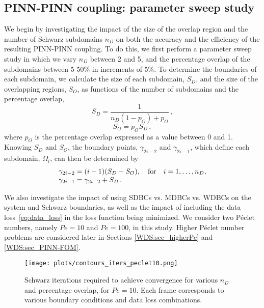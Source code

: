 \documentclass[oneside,final]{csri23}
\begin{document}
\subsection{PINN-PINN coupling: parameter sweep study} \label{WDS:sec_overlap}

We begin by investigating the impact of the size of the overlap region and the number of Schwarz subdomains $n_D$ on both the accuracy and the efficiency of the resulting PINN-PINN coupling.  To do this, we first perform a parameter sweep study in which we vary $n_D$ between 2 and 5, and the percentage overlap of the subdomains between 5-50\% in increments of 5\%. To determine the boundaries of each subdomain, we calculate the size of each subdomain, $S_D$, and the size of the overlapping regions, $S_O$, as functions of the number of subdomains and the percentage overlap,
\begin{equation} 
    S_D = \frac{1}{n_D(1 - p_{O}) + p_{O}}\, ,
\end{equation}
\begin{equation}
    S_O = p_{O}S_D\, ,
\end{equation}
where $p_O$ is the percentage overlap expressed as a value between 0 and 1. Knowing $S_D$ and $S_O$, the boundary points, $\gamma_{2i-2}$ and $\gamma_{2i-1}$, which define each subdomain, $\Omega_i$, can then be determined by
\begin{equation} \label{eq:gamma_i_formulat}
    \begin{array}[h]{l}
        \gamma_{2i-2} = (i-1)(S_D - S_O), \quad \text{for} \quad i=1,\dots,n_D,\\
        \gamma_{2i-1} = \gamma_{2i-2} + S_D\, .
    \end{array}
\end{equation}

We also investigate the impact of using SDBCs vs. MDBCs vs. WDBCs on the system and Schwarz boundaries, as well as the impact of including the data loss~\eqref{eq:data_loss} in the loss function being minimized. We consider two P\'{e}clet numbers, namely $Pe = 10$ and $Pe = 100$, in this study.
Higher P\'{e}clet number problems are considered later in Sections \ref{WDS:sec_higherPe} and \ref{WDS:sec_PINN-FOM}.  

\begin{figure}
    \centering
    \texttt{[image: plots/contours\_iters\_peclet10.png]}
    \caption{Schwarz iterations required to achieve convergence for various $n_D$ and percentage overlap, for $Pe = 10$. Each frame corresponds to various boundary conditions and data loss combinations.}
    \label{fig:iter_sweep10}
\end{figure}
\end{document}
